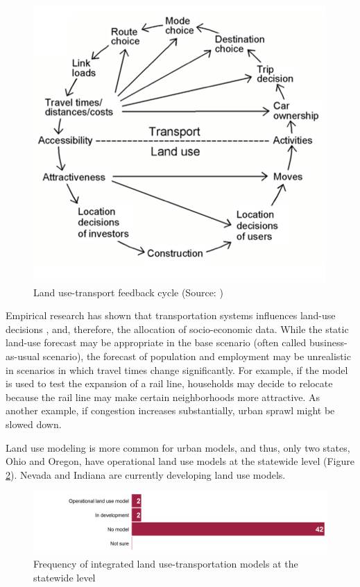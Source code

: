 \begin{figure}
\centering
\includegraphics[scale=0.5]{graphics/29-land-use-transport-feedback-cycle}
\caption[Land use-transport feedback cycle]{Land use-transport feedback cycle (Source: \cite{wegener94})}
\label{fig:landuse-transport-feedback}
\end{figure}

Empirical research has shown that transportation systems influences land-use decisions \citep{hansen59}, and, therefore, the allocation of socio-economic data. While the static land-use forecast may be appropriate in the base scenario (often called business-as-usual scenario), the forecast of population and employment may be unrealistic in scenarios in which travel times change significantly. For example, if the model is used to test the expansion of a rail line, households may decide to relocate because the rail line may make certain neighborhoods more attractive. As another example, if congestion increases substantially, urban sprawl might be slowed down.

Land use modeling is more common for urban models, and thus, only two states, Ohio and Oregon, have operational land use models at the statewide level (Figure \ref{fig:integrated-models}). Nevada and Indiana are currently developing land use models.

\begin{figure}   %
\centering
\includegraphics[width=6.4in]{graphics/30-integrated-land-use-transport-models}
\caption{Frequency of integrated land use-transportation models at the statewide level}
\label{fig:integrated-models}
\end{figure}

